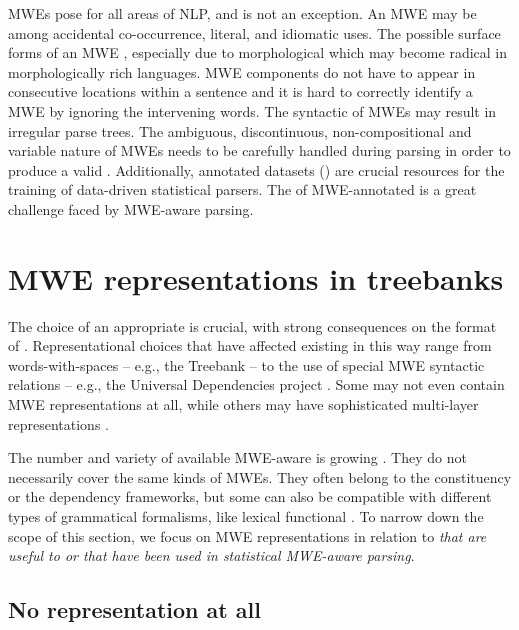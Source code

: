\documentclass[output=paper]{langsci/langscibook}
\begin{document}
MWEs pose  for all areas of NLP, and  is not an exception.
An MWE may be  among accidental co-occurrence, literal, and idiomatic uses. The possible surface forms of an MWE , especially due to morphological  which may become radical in morphologically rich languages. MWE components do not have to appear in consecutive locations within a sentence and it is hard to correctly identify a  MWE by ignoring the intervening words. 
The syntactic  of MWEs may result in irregular parse trees.
The ambiguous, discontinuous, non-compositional and variable nature of MWEs needs to be carefully handled during parsing in order to produce a valid . 
Additionally, annotated datasets () are crucial resources for the training of data-driven statistical parsers. 
The  of MWE-annotated  is a great challenge faced by MWE-aware parsing. 


%
\section{MWE representations in treebanks} 
\label{con:sec:representation}


The choice of an appropriate  is crucial, with strong consequences on the format of . Representational choices that have affected existing  in this way range
from words-with-spaces -- e.g., the  Treebank \citep{candito:2009} -- to the use of special MWE syntactic relations -- e.g., the Universal Dependencies project \citep{nivre16}. Some  may not even contain MWE representations at all, 
while others may have sophisticated multi-layer representations 
\citep{prague}. 


The number and variety of available MWE-aware  is growing \citep{rosen:2015}. 
They do not necessarily cover the same kinds of MWEs. 
They often belong to the constituency or the dependency frameworks, but
some can also be compatible with different types of grammatical formalisms, like lexical functional  \citep{dyvik16}. 
To narrow down the scope of this section, we focus on MWE representations in relation to  \emph{that are useful to or that have been used in statistical MWE-aware parsing}.

\subsection{No representation at all}
\label{con:ssec:norep}
\end{document}
